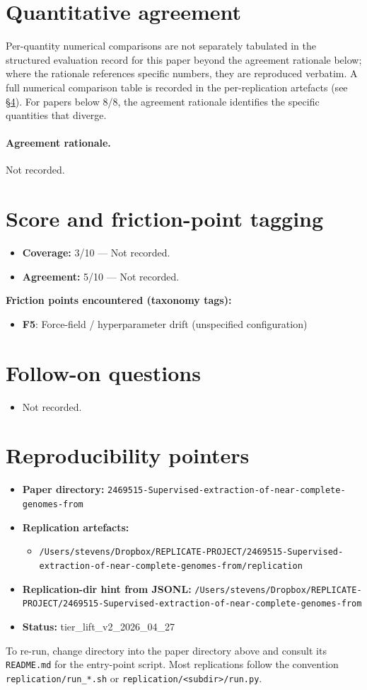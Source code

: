 \documentclass[11pt]{article}
\begin{document}
\section{Quantitative agreement}
Per-quantity numerical comparisons are not separately tabulated in the structured evaluation record for this paper beyond the agreement rationale below; where the rationale references specific numbers, they are reproduced verbatim. A full numerical comparison table is recorded in the per-replication artefacts (see \S\ref{sec:repro}). For papers below 8/8, the agreement rationale identifies the specific quantities that diverge.

\paragraph{Agreement rationale.} Not recorded.

\section{Score and friction-point tagging}\label{sec:friction}
\begin{itemize}
\item \textbf{Coverage:} 3/10 --- Not recorded.
\item \textbf{Agreement:} 5/10 --- Not recorded.
\end{itemize}

\noindent\textbf{Friction points encountered (taxonomy tags):}
\begin{itemize}
\item \textbf{F5}: Force-field / hyperparameter drift (unspecified configuration)
\end{itemize}

\section{Follow-on questions}
\begin{itemize}
\item Not recorded.
\end{itemize}

\section{Reproducibility pointers}\label{sec:repro}
\begin{itemize}
\item \textbf{Paper directory:} \texttt{2469515-Supervised-extraction-of-near-complete-genomes-from}
\item \textbf{Replication artefacts:}
\begin{itemize}
\item \texttt{/Users/stevens/Dropbox/REPLICATE-PROJECT/2469515-Supervised-extraction-of-near-complete-genomes-from/replication}
\end{itemize}
\item \textbf{Replication-dir hint from JSONL:} \texttt{/Users/stevens/Dropbox/REPLICATE-PROJECT/2469515-Supervised-extraction-of-near-complete-genomes-from}
\item \textbf{Status:} tier\_lift\_v2\_2026\_04\_27
\end{itemize}

To re-run, change directory into the paper directory above and consult its \texttt{README.md} for the entry-point script. Most replications follow the convention \texttt{replication/run\_*.sh} or \texttt{replication/<subdir>/run.py}.
\end{document}
